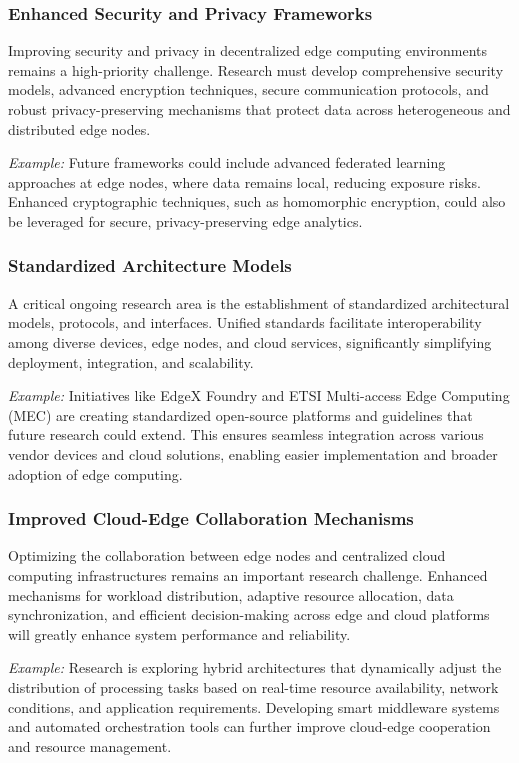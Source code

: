 \documentclass[runningheads]{llncs}
\begin{document}
\subsubsection{Enhanced Security and Privacy Frameworks}
Improving security and privacy in decentralized edge computing environments remains a high-priority challenge. Research must develop comprehensive security models, advanced encryption techniques, secure communication protocols, and robust privacy-preserving mechanisms that protect data across heterogeneous and distributed edge nodes.

\textit{Example:} Future frameworks could include advanced federated learning approaches at edge nodes, where data remains local, reducing exposure risks. Enhanced cryptographic techniques, such as homomorphic encryption, could also be leveraged for secure, privacy-preserving edge analytics.

\subsubsection{Standardized Architecture Models}
A critical ongoing research area is the establishment of standardized architectural models, protocols, and interfaces. Unified standards facilitate interoperability among diverse devices, edge nodes, and cloud services, significantly simplifying deployment, integration, and scalability.

\textit{Example:} Initiatives like EdgeX Foundry and ETSI Multi-access Edge Computing (MEC) are creating standardized open-source platforms and guidelines that future research could extend. This ensures seamless integration across various vendor devices and cloud solutions, enabling easier implementation and broader adoption of edge computing.

\subsubsection{Improved Cloud-Edge Collaboration Mechanisms}
Optimizing the collaboration between edge nodes and centralized cloud computing infrastructures remains an important research challenge. Enhanced mechanisms for workload distribution, adaptive resource allocation, data synchronization, and efficient decision-making across edge and cloud platforms will greatly enhance system performance and reliability.

\textit{Example:} Research is exploring hybrid architectures that dynamically adjust the distribution of processing tasks based on real-time resource availability, network conditions, and application requirements. Developing smart middleware systems and automated orchestration tools can further improve cloud-edge cooperation and resource management.
\end{document}
